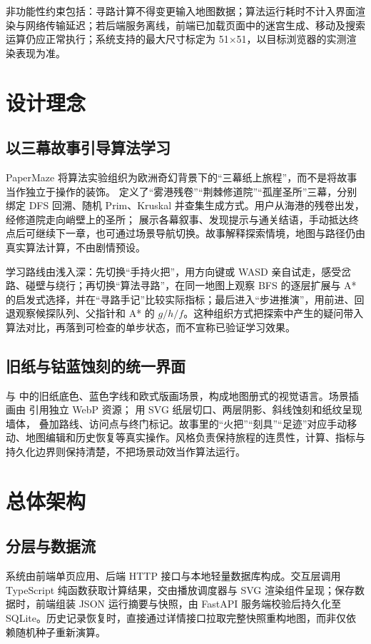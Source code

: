 \documentclass[a4paper]{article}
\begin{document}
非功能性约束包括：寻路计算不得变更输入地图数据；算法运行耗时不计入界面渲染与网络传输延迟；若后端服务离线，前端已加载页面中的迷宫生成、移动及搜索运算仍应正常执行；系统支持的最大尺寸标定为 51×51，以目标浏览器的实测渲染表现为准。

\section{设计理念}

\subsection{以三幕故事引导算法学习}
PaperMaze 将算法实验组织为欧洲奇幻背景下的“三幕纸上旅程”，而不是将故事当作独立于操作的装饰。 定义了“雾港残卷”“荆棘修道院”“孤崖圣所”三幕，分别绑定 DFS 回溯、随机 Prim、Kruskal 并查集生成方式。用户从海港的残卷出发，经修道院走向峭壁上的圣所； 展示各幕叙事、发现提示与通关结语，手动抵达终点后可继续下一章，也可通过场景导航切换。故事解释探索情境，地图与路径仍由真实算法计算，不由剧情预设。

学习路线由浅入深：先切换“手持火把”，用方向键或 WASD 亲自试走，感受岔路、碰壁与绕行；再切换“算法寻路”，在同一地图上观察 BFS 的逐层扩展与 A* 的启发式选择，并在“寻路手记”比较实际指标；最后进入“步进推演”，用前进、回退观察候探队列、父指针和 A* 的 $g/h/f$。这种组织方式把探索中产生的疑问带入算法对比，再落到可检查的单步状态，而不宣称已验证学习效果。

\subsection{旧纸与钴蓝蚀刻的统一界面}
 与  中的旧纸底色、蓝色字线和欧式版画场景，构成地图册式的视觉语言。场景插画由  引用独立 WebP 资源； 用 SVG 纸层切口、两层阴影、斜线蚀刻和纸纹呈现墙体， 叠加路线、访问点与终门标记。故事里的“火把”“刻具”“足迹”对应手动移动、地图编辑和历史恢复等真实操作。风格负责保持旅程的连贯性，计算、指标与持久化边界则保持清楚，不把场景动效当作算法运行。

\section{总体架构}

\subsection{分层与数据流}
系统由前端单页应用、后端 HTTP 接口与本地轻量数据库构成。交互层调用 TypeScript 纯函数获取计算结果，交由播放调度器与 SVG 渲染组件呈现；保存数据时，前端组装 JSON 运行摘要与快照，由 FastAPI 服务端校验后持久化至 SQLite。历史记录恢复时，直接通过详情接口拉取完整快照重构地图，而非仅依赖随机种子重新演算。
\end{document}
